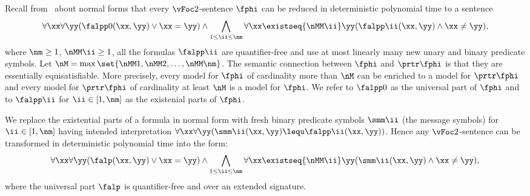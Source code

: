Recall from~ about normal forms that every $\vFoc2$-sentence
$\fphi$ can be reduced in deterministic polynomial time to a sentence
\[
  \forall\xx\forall\yy(\falpp0(\xx,\yy) \lor \xx=\yy) \land
  \bigwedge_{1 \leq \ii \leq \nm} \forall\xx\existseq{\nMM\ii}\yy
  (\falpp\ii(\xx,\yy) \land \xx\neq\yy),
\]
where $\nm\geq1$, $\nMM\ii\geq1$, all the formulas $\falpp\ii$ are
quantifier-free and use at most linearly many new unary and binary predicate
symbols.
Let $\nM = \max\set{\nMM1,\nMM2,\dots,\nMM\nm}$.
The semantic connection between $\fphi$ and $\prtr\fphi$ is that they are
essentially equisatisfiable.
More precisely, every model for $\fphi$ of cardinality more than $\nM$ can be
enriched to a model for $\prtr\fphi$ and every model for $\prtr\fphi$ of
cardinality at least $\nM$ is a model for $\fphi$.
We refer to $\falpp0$ as the universal part of $\fphi$ and to $\falpp\ii$ for
$\ii\in[1,\nm]$ as the existenial parts of $\fphi$.

We replace the existential parts of a formula in normal form with fresh binary
predicate symbols $\smm\ii$ (the message symbols) for $\ii\in[1,\nm]$
having intended interpretation
$\forall\xx\forall\yy(\smm\ii(\xx,\yy)\lequ\falpp\ii(\xx,\yy))$.
Hence any $\vFoc2$-sentence can be transformed in deterministic polynomial time
into the form:
\begin{equation}\label{eq:counting-base}
\forall\xx\forall\yy(\falp(\xx,\yy)\lor\xx=\yy) \land
\bigwedge_{1\leq\ii\leq\nm} \forall\xx\existseq{\nMM\ii}\yy
(\smm\ii(\xx,\yy)\land\xx\neq\yy),
\end{equation}
where the universal part $\falp$ is quantifier-free and over an extended
signature.

